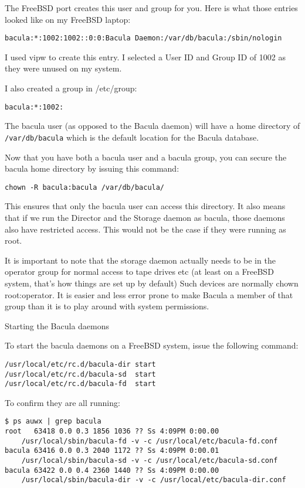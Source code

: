 The FreeBSD port creates this user and group for you.
Here is what those entries looked like on my FreeBSD laptop: 

\footnotesize
\begin{verbatim}
bacula:*:1002:1002::0:0:Bacula Daemon:/var/db/bacula:/sbin/nologin
\end{verbatim}
\normalsize

I used vipw to create this entry. I selected a User ID and Group ID  of 1002
as they were unused on my system.  

I also created a group in /etc/group:  

\footnotesize
\begin{verbatim}
bacula:*:1002:
\end{verbatim}
\normalsize

The bacula user (as opposed to the Bacula daemon) will have a home  directory
of {\tt /var/db/bacula} which is the  default location for the Bacula
database.  

Now that you have both a bacula user and a bacula group, you can  secure the
bacula home directory by issuing this command: 

\footnotesize
\begin{verbatim}
chown -R bacula:bacula /var/db/bacula/
\end{verbatim}
\normalsize

This ensures that only the bacula user can access this directory.  It also
means that if we run the Director and the Storage daemon  as bacula, those
daemons also have restricted access. This would not be  the case if they were
running as root.  

It is important to note that the storage daemon actually needs  to be in the
operator group for normal access to tape drives etc (at  least on a FreeBSD
system, that's how things are set up by default)  Such devices are normally
chown root:operator. It is easier and less  error prone  to make Bacula a
member of that group than it is to play around  with system permissions. 

Starting the Bacula daemons 

To start the bacula daemons on a FreeBSD system, issue the following command: 

\footnotesize
\begin{verbatim}
/usr/local/etc/rc.d/bacula-dir start
/usr/local/etc/rc.d/bacula-sd  start
/usr/local/etc/rc.d/bacula-fd  start
\end{verbatim}
\normalsize

To confirm they are all running: 

\footnotesize
\begin{verbatim}
$ ps auwx | grep bacula
root   63418 0.0 0.3 1856 1036 ?? Ss 4:09PM 0:00.00
    /usr/local/sbin/bacula-fd -v -c /usr/local/etc/bacula-fd.conf
bacula 63416 0.0 0.3 2040 1172 ?? Ss 4:09PM 0:00.01
    /usr/local/sbin/bacula-sd -v -c /usr/local/etc/bacula-sd.conf
bacula 63422 0.0 0.4 2360 1440 ?? Ss 4:09PM 0:00.00
    /usr/local/sbin/bacula-dir -v -c /usr/local/etc/bacula-dir.conf
\end{verbatim}
\normalsize
